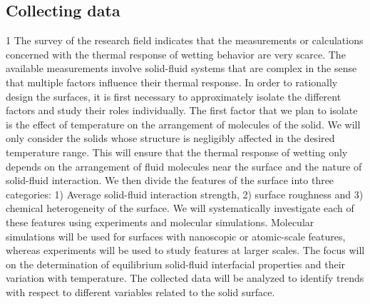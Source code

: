 \subsection{Collecting data}

\par 1 The survey of the research field indicates that the measurements or calculations concerned with the thermal response of wetting behavior are very scarce. The available measurements involve solid-fluid systems that are complex in the sense that multiple factors influence their thermal response. In order to rationally design the surfaces, it is first necessary to approximately isolate the different factors and study their roles individually. The first factor that we plan to isolate is the effect of temperature on the arrangement of molecules of the solid. We will only consider the solids whose structure is negligibly affected in the desired temperature range. This will ensure that the thermal response of wetting only depends on the arrangement of fluid molecules near the surface and the nature of solid-fluid interaction. We then divide the features of the surface into three categories: 1) Average solid-fluid interaction strength, 2) surface roughness and 3) chemical heterogeneity of the surface. We will systematically investigate each of these features using experiments and molecular simulations. Molecular simulations will be used for surfaces with nanoscopic or atomic-scale features, whereas experiments will be used to study features at larger scales. The focus will on the determination of equilibrium solid-fluid interfacial properties and their variation with temperature. The collected data will be analyzed to identify trends with respect to different variables related to the solid surface.

